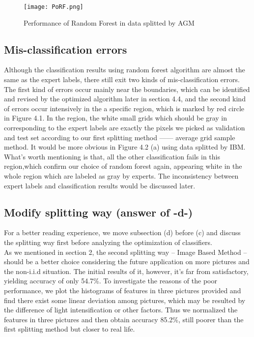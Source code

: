 \documentclass[11pt]{scrartcl} %
\begin{document}
\begin{figure}[htb]
	\centering
	\texttt{[image: PoRF.png]} %
	\caption{Performance of Random Forest in data splitted by AGM}
\end{figure}




\subsection{Mis-classification errors}
Although the classification results using random forest algorithm are almost the same as the expert labels, there still exit two kinds of mis-classification errors. The first kind of errors occur mainly near the boundaries, which can be identified and revised by the optimized algorithm later in section 4.4, and the second kind of errors occur intensively in the a specific region, which is marked by red circle in Figure 4.1. In the region, the white small grids which should be gray in corresponding to the expert labels are exactly the pixels we picked as validation and test set according to our first splitting method —— average grid sample method. It would be more obvious in Figure 4.2 (a) using data splitted by IBM. What's worth mentioning is that, all the other classification fails in this region,which confirm our choice of random forest again, appearing white in the whole region which are labeled as gray by experts. The inconsistency between expert labels and classification results would be discussed later.

\subsection{Modify splitting way (answer of -d-)}
For a better reading experience, we move subsection (d) before (c) and discuss the splitting way first before analyzing the optimization of classifiers. \\

As we mentioned in section 2, the second splitting way -- Image Based Method -- should be a better choice considering the future application on more pictures and the non-i.i.d situation. The initial results of it, however, it's far from satisfactory, yielding accuracy of only 54.7\%. To investigate the reasons of the poor performance, we plot the histograms of features in three pictures provided and find there exist some linear deviation among pictures, which may be resulted by the difference of light intensification or other factors. Thus we normalized the features in three pictures and then obtain accuracy 85.2\%, still poorer than the first splitting method but closer to real life. \\
\end{document}
